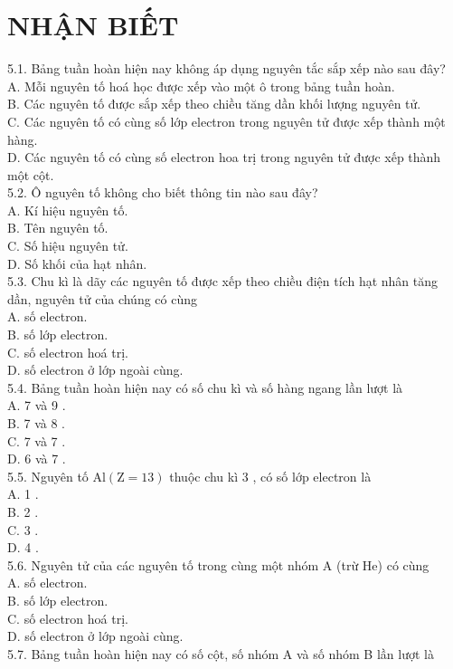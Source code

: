 \documentclass[10pt]{article}
\begin{document}
\section*{NHẬN BIẾT}
5.1. Bảng tuần hoàn hiện nay không áp dụng nguyên tắc sắp xếp nào sau đây?\\
A. Mỗi nguyên tố hoá học được xếp vào một ô trong bảng tuần hoàn.\\
B. Các nguyên tố được sắp xếp theo chiều tăng dần khối lượng nguyên tử.\\
C. Các nguyên tố có cùng số lớp electron trong nguyên tử được xếp thành một hàng.\\
D. Các nguyên tố có cùng số electron hoa trị trong nguyên tử được xếp thành một cột.\\
5.2. Ô nguyên tố không cho biết thông tin nào sau đây?\\
A. Kí hiệu nguyên tố.\\
B. Tên nguyên tố.\\
C. Số hiệu nguyên tử.\\
D. Số khối của hạt nhân.\\
5.3. Chu kì là dãy các nguyên tố được xếp theo chiều điện tích hạt nhân tăng dần, nguyên tử của chúng có cùng\\
A. số electron.\\
B. số lớp electron.\\
C. số electron hoá trị.\\
D. số electron ở lớp ngoài cùng.\\
5.4. Bảng tuần hoàn hiện nay có số chu kì và số hàng ngang lần lượt là\\
A. 7 và 9 .\\
B. 7 và 8 .\\
C. 7 và 7 .\\
D. 6 và 7 .\\
5.5. Nguyên tố $\mathrm{Al}(\mathrm{Z}=13)$ thuộc chu kì 3 , có số lớp electron là\\
A. 1 .\\
B. 2 .\\
C. 3 .\\
D. 4 .\\
5.6. Nguyên tử của các nguyên tố trong cùng một nhóm A (trừ He) có cùng\\
A. số electron.\\
B. số lớp electron.\\
C. số electron hoá trị.\\
D. số electron ở lớp ngoài cùng.\\
5.7. Bảng tuần hoàn hiện nay có số cột, số nhóm A và số nhóm B lần lượt là\\
\end{document}
